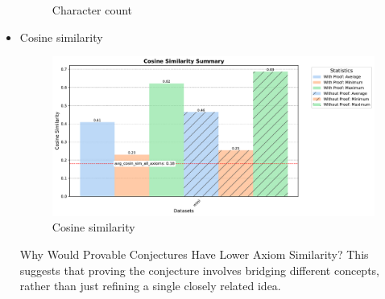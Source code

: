 \documentclass[english,version-2020-11]{uzl-thesis}
\begin{document}
\begin{itemize}
\begin{figure}[h!]
            \caption{Character count}
            \label{fig:character_count}
          \end{figure}
          \clearpage
        \item Cosine similarity
          \begin{figure}[h!]
            \centering
            \includegraphics[width=\textwidth]{cosine_similarity_mini_noAdded_summary.pdf} %
            \caption{Cosine similarity}
            \label{fig:cosine_similarity}
          \end{figure}
          Why Would Provable Conjectures Have Lower Axiom Similarity? This suggests that proving the conjecture involves bridging different concepts, rather than just refining a single closely related idea.
          \clearpage
      \end{itemize}
\end{document}
